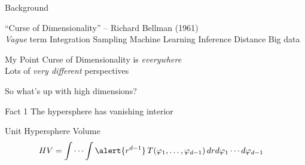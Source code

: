 \documentclass[14pt]{beamer}
\begin{document}
\begin{frame}{Background}
  \begin{outline}
  \1 ``Curse of Dimensionality'' -- Richard Bellman (1961) \\
  \1 \emph{Vague} term
    \2 Integration
    \2 Sampling
    \2 Machine Learning
    \2 Inference
    \2 Distance
    \2 Big data
  \end{outline}
\end{frame}


\begin{frame}{My Point}
  Curse of Dimensionality is \emph{everywhere} \\
  Lots of \emph{very different} perspectives

  \bigskip
  So what's up with high dimensions?
\end{frame}


\begin{frame}{Fact 1}
  The hypersphere has vanishing interior
\end{frame}

\begin{frame}{Unit Hypersphere Volume}
  \begin{equation*} \begin{aligned}
      HV &= \int\cdots\int \alert{r^{d-1}}\,
           T(\varphi_{1},\dots,\varphi_{d-1})\,
           dr d\varphi_{1}\cdots d\varphi_{d-1}
  \end{aligned} \end{equation*}
\end{frame}
\end{document}
